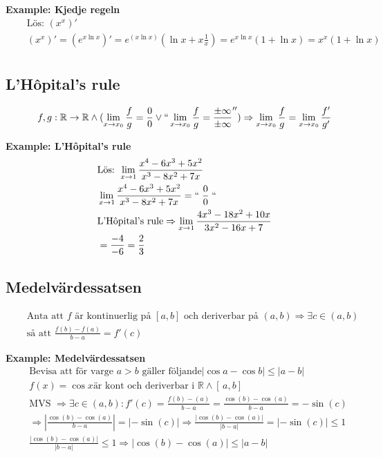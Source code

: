 \documentclass{article}
\begin{document}
\textbf{Example: Kjedje regeln}
\begin{align*}
  &\quad  \text{Lös: } (x^x)'  \\
  &\quad  (x^x)'=(e^{x\ln{x}})'=e^(x\ln{x})(\ln{x}+x\frac{1}{x})=e^{x\ln{x}}(1+\ln{x})=x^x(1+\ln{x}) \\
\end{align*}

\newpage

\subsection{L'Hôpital's rule} 
\begin{align*}
  &\quad  f,g:\mathbb{R}\to\mathbb{R} \land (\lim_{x \to x_0}\frac{f}{g}
  =\frac{0}{0}\lor ``\lim_{x\to x_0}\frac{f}{g}=\frac{\pm \infty}{\pm \infty}'')
  \Rightarrow \lim_{x \to x_0}\frac{f}{g}=\lim_{x \to x_0}\frac{f'}{g'} \\ 
\end{align*}

\textbf{Example: L'Hôpital's rule}
\begin{align*}
  &\quad  \text{Lös: } \lim_{x \to 1}\frac{x^4-6x^3+5x^2}{x^3-8x^2+7x}\\
  &\quad  \lim_{x \to 1}\frac{x^4-6x^3+5x^2}{x^3-8x^2+7x} = `` \; \frac{0}{0} \; `` \\
  &\quad  \text{L'Hôpital's rule} \Rightarrow \lim_{x \to 1}\frac{4x^3-18x^2+10x}{3x^2-16x+7} \\
  &\quad  = \frac{-4}{-6} = \frac{2}{3} \\
\end{align*}


\subsection{Medelvärdessatsen} 
\begin{align*}
  &\quad  \text{Anta att $f$ är kontinuerlig på $[a,b]$ och deriverbar på $(a,b)$}
  \Rightarrow \exists c \in (a,b) \\
  &\quad  \text{så att } \frac{f(b)-f(a)}{b-a}= f'(c)
\end{align*}

\textbf{Example: Medelvärdessatsen}
\begin{align*}
  &\quad  \text{Bevisa att för varge $a>b$ gäller följande} |\cos{a}-\cos{b}| \leq |a-b| \\
  &\quad  f(x)=\cos{x} \text{är kont och deriverbar i } \mathbb{R} \land [ \, a,b ] \, \\
  &\quad  \text{MVS }\Rightarrow \exists c \in (a,b):f'(c)=\frac{f(b)-(a)}{b-a}=
  \frac{\cos(b)-\cos(a)}{b-a}=-\sin(c) \\
  &\quad  \Rightarrow |\frac{\cos(b)-\cos(a)}{b-a}|=|-\sin(c)| \Rightarrow
  \frac{|\cos(b)-\cos(a)|}{|b-a|}=|-\sin(c)| \leq 1 \\
  &\quad  \frac{|\cos(b)-\cos(a)|}{|b-a|} \leq 1 \Rightarrow |\cos(b)-\cos(a)| \leq |a-b|
\end{align*}
\end{document}
